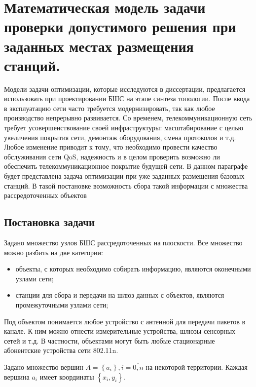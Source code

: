 \section{Математическая модель задачи проверки допустимого решения  при заданных местах размещения станций.}
Модели задачи оптимизации, которые исследуются в диссертации, предлагается использовать при проектировании БШС на этапе синтеза топологии. После ввода в эксплуатацию сети часто требуется модернизировать, так как любое производство непрерывно развивается. Со временем, телекоммуникационную сеть требует усовершенствование своей инфраструктуры: масштабирование с целью увеличения покрытия сети, демонтаж оборудования, смена протоколов и т.д. Любое изменение приводит к тому, что необходимо провести качество обслуживания сети QoS, надежность и в целом проверить возможно ли обеспечить телекоммуникационное покрытие будущей сети. В данном параграфе будет представлена задача оптимизации при уже заданных размещения базовых станций. В такой постановке возможность сбора такой информации с множества рассредоточенных объектов 


\subsection{Постановка задачи}

Задано множество узлов БШС рассредоточенных на плоскости. Все множество можно разбить на две категории:
\begin{itemize}
    \item объекты, с которых необходимо собирать информацию, являются оконечными узлами сети;
    \item станции для сбора и передачи на шлюз данных с объектов, являются промежуточными узлами сети; 
\end{itemize}
Под объектом понимается любое устройство с антенной для передачи пакетов в канале. К ним можно отнести измерительные устройства, шлюзы сенсорных сетей и т.д. В частности, объектами могут быть любые стационарные абонентские устройства сети 802.11n.

Задано множество вершин $A= \left\{ a_i \right\}, i=\overline{0,n}$ на некоторой территории. Каждая вершина $a_i$ имеет координаты $\left\{ x_i, y_i \right\}$.

